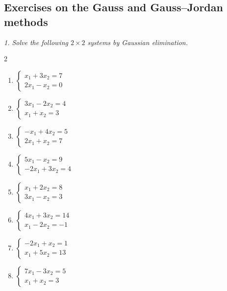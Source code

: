 \subsection{Exercises on the Gauss and Gauss–Jordan methods}
\bigskip

\emph{1. Solve the following $2\times 2$ systems by Gaussian elimination.}
\bigskip
\begin{multicols}{2}\raggedright
\begin{enumerate}[label=\arabic*., leftmargin=*]

\item $\begin{cases}x_1+3x_2=7\\2x_1-x_2=0\end{cases}$

\item $\begin{cases}3x_1-2x_2=4\\x_1+x_2=3\end{cases}$

\item $\begin{cases}-x_1+4x_2=5\\2x_1+x_2=7\end{cases}$

\item $\begin{cases}5x_1-x_2=9\\-2x_1+3x_2=4\end{cases}$

\item $\begin{cases}x_1+2x_2=8\\3x_1-x_2=3\end{cases}$

\item $\begin{cases}4x_1+3x_2=14\\x_1-2x_2=-1\end{cases}$

\item $\begin{cases}-2x_1+x_2=1\\x_1+5x_2=13\end{cases}$

\item $\begin{cases}7x_1-3x_2=5\\x_1+x_2=3\end{cases}$


\end{enumerate}
\end{multicols}
